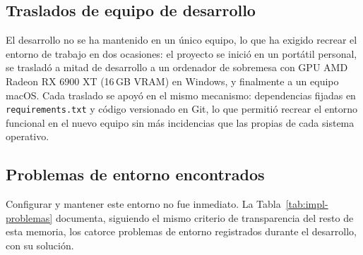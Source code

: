 \subsection{Traslados de equipo de desarrollo}

El desarrollo no se ha mantenido en un único equipo, lo que ha exigido
recrear el entorno de trabajo en dos ocasiones: el proyecto se inició en un
portátil personal, se trasladó a mitad de desarrollo a un ordenador de
sobremesa con GPU AMD Radeon RX 6900 XT (16\,GB VRAM) en Windows, y finalmente a un equipo macOS. Cada
traslado se apoyó en el mismo mecanismo: dependencias fijadas en
\texttt{requirements.txt} y código versionado en Git, lo que permitió
recrear el entorno funcional en el nuevo equipo sin más incidencias que las
propias de cada sistema operativo.

\subsection{Problemas de entorno encontrados}
\label{subsec:implementacion-problemas}

Configurar y mantener este entorno no fue inmediato. La
Tabla~\ref{tab:impl-problemas} documenta, siguiendo el
mismo criterio de transparencia del resto de esta memoria, los catorce problemas de
entorno registrados durante el desarrollo, con su solución.

